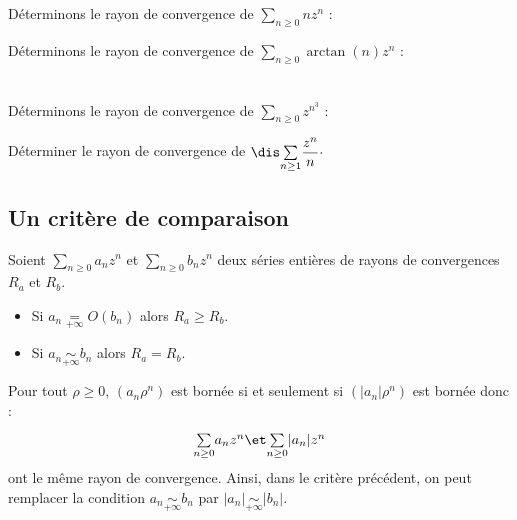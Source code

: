 \documentclass[a4paper,10pt]{report}
\newcommand{\Sum}[2]{\ensuremath{\textstyle{\sum\limits_{#1}^{#2}}}}
\begin{document}
\begin{ex} Déterminons le rayon de convergence de $\Sum{n \geq 0}{} n z^n$ :

\vspace{4cm}
\end{ex}

\begin{ex} Déterminons le rayon de convergence de $\Sum{n \geq 0}{} \arctan(n) z^n$ :

\vspace{4cm}
\end{ex}

\newpage

$\phantom{test}$

\vspace{2cm}

\begin{ex} Déterminons le rayon de convergence de $\Sum{n \geq 0}{} z^{n^3}$ :

\vspace{4cm}
\end{ex}

\begin{exa} Déterminer le rayon de convergence de $\dis \Sum{n \geq 1}{} \dfrac{z^n}{n} \cdot$
\end{exa}
\subsection{Un critère de comparaison}

\begin{prop}
Soient $\Sum{n \geq 0}{} a_n z^n$ et $\Sum{n \geq 0}{} b_n z^n$ deux séries entières de rayons de convergences $R_a$ et $R_b$. 
\begin{itemize}
\item Si $a_n \underset{+ \infty}{=} O(b_n)$ alors $R_a \geq R_b$.
\item Si $a_n \underset{+ \infty}{\sim} b_n$ alors $R_a = R_b$.
\end{itemize}
\end{prop}

\begin{preuve}
\vspace{5cm}
\end{preuve}

\begin{rem} Pour tout $\rho \geq 0$, $(a_n \rho^n)$ est bornée si et seulement si $(\vert a_n \vert \rho^n)$ est bornée donc :
$$ \Sum{n \geq 0}{} a_n z^n \et \Sum{n \geq 0}{} \vert a_n \vert z^n$$
ont le même rayon de convergence. Ainsi, dans le critère précédent, on peut remplacer la condition $a_n \underset{+ \infty}{\sim} b_n$ par $\vert a_n \vert \underset{+ \infty}{\sim} \vert b_n \vert$.
\end{rem}
\end{document}
